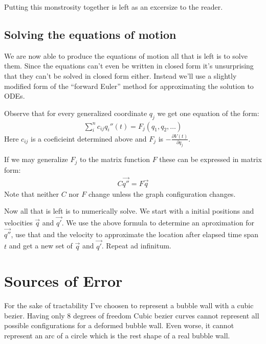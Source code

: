 \documentclass{article}
\begin{document}
Putting this monstrosity together is left as an excersize to the reader.
\subsection{Solving the equations of motion}
We are now able to produce the equations of motion all that is left is to solve
them. Since the equations can't even be written in closed form it's
unsurprising that they can't be solved in closed form either. Instead we'll
use a slightly modified form of the ``forward Euler'' method for approximating
the solution to ODEs.

Observe that for every generalized coordinate $q_j$ we get one equation of the
form:
\begin{align*}
\sum_i^n c_{ij}q_i''(t) = F_j(q_1,q_2,\ldots)
\end{align*}
Here $c_{ij}$ is a coeficieint determined above and $F_j$ is
$-\frac{\partial V(t)}{\partial q_j}$.

If we may generalize $F_j$ to the matrix function $F$ these can be expressed in
matrix form:
\begin{align*}
C \vec{q''}= F \vec{q}
\end{align*}
Note that neither $C$ nor $F$ change unless the graph configuration changes.

Now all that is left is to numerically solve. We start with a initial positions
and velocities $\vec{q}$ and $\vec{q'}$. We use the above formula to determine
an aproximation for $\vec{q''}$, use that and the velocity to approximate the
location after elapsed time span $t$ and get a new set of $\vec{q}$ and
$\vec{q'}$. Repeat ad infinitum.
\section{Sources of Error}
For the sake of tractability I've choosen to represent a bubble wall with a
cubic bezier. Having only 8 degrees of freedom Cubic bezier curves cannot
represent all possible configurations for a deformed bubble wall. Even
worse, it cannot represent an arc of a circle which is the rest shape of a real
bubble wall.
\end{document}
